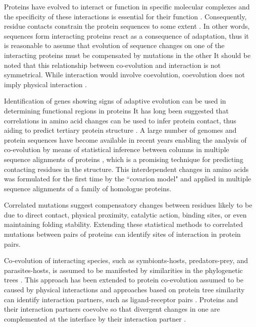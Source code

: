 Proteins have evolved to interact or function in specific molecular complexes and the specificity of these interactions is essential for their function \cite{pazos1997correlated}.
Consequently, residue contacts constrain the protein sequences to some extent \cite{pazos1997correlated}.
In other words, sequences form interacting proteins react as a consequence of adaptation, thus it is reasonable to assume that evolution of sequence changes on one of the interacting proteins must be compensated by mutations in the other \cite{pazos1997correlated}
It should be noted that this relationship between co-evolution and interaction is not symmetrical. 
While interaction would involve coevolution, coevolution does not imply physical interaction \cite{fares2006novel}.

Identification of genes showing signs of adaptive evolution can be used in determining functional regions in proteins \cite{fares2006novel}
It has long been suggested that correlations in amino acid changes can be used to infer protein contact, thus aiding to predict tertiary protein structure \cite{morcos2011direct, burger2010disentangling}.
A large number of genomes and protein sequences have become available in recent years enabling the analysis of co-evolution by means of statistical inference between columns in multiple sequence alignments of proteins \cite{burger2010disentangling, burger2010disentangling}, which is a promising technique for predicting contacting residues in the structure.
This interdependent changes in amino acids was formulated for the first time by the ``covarion model" \cite{fitch1970improved} and applied in multiple sequence alignments of a family of homologue proteins\cite{de2013emerging}.

Correlated mutations suggest compensatory changes between residues likely to be due to direct contact, physical proximity, catalytic action, binding sites, or even maintaining folding stability.
Extending these statistical methods to correlated mutations between pairs of proteins can identify sites of interaction in protein pairs\cite{de2013emerging}.

Co‐evolution of interacting species, such as symbionts-hosts, predators-prey, and parasites-hosts, is assumed to be manifested by similarities in the phylogenetic trees \cite{de2013emerging}.
This approach has been extended to protein co‐evolution assumed to be caused by physical interactions and approaches based on protein tree similarity can identify interaction partners, such as ligand-receptor pairs \cite{de2013emerging}.
Proteins and their interaction partners coevolve so that divergent changes in one are complemented at the interface by their interaction partner  \cite{goh2000co}.

